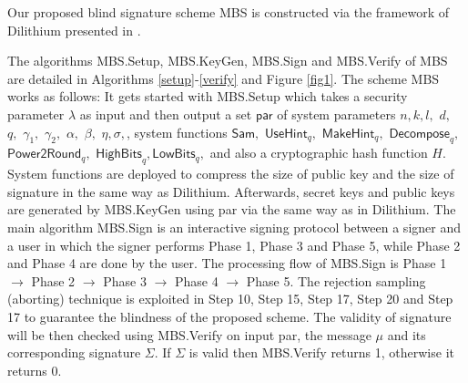 \documentclass[conference]{IEEEtran}
\begin{document}
	Our proposed blind signature scheme \textsf{MBS} is constructed via the framework of \textsf{Dilithium} presented in \cite{DLL+17, DKL+19}. %
	
	The algorithms \textsf{MBS.Setup}, \textsf{MBS.KeyGen}, \textsf{MBS.Sign} and \textsf{MBS.Verify} of \textsf{MBS} are detailed in Algorithms \ref{setup}-\ref{verify} and Figure \ref{fig1}. The scheme \textsf{MBS} works as follows: It gets started with \textsf{MBS.Setup} which takes a security parameter $\lambda$ as input and then output a set $\mathsf{par}$ of system parameters $n, k, l,$  $d,$  $q, $ $\gamma_1,$ $ \gamma_2,$  $\alpha,$ $ \beta,$ $ \eta, \sigma,$, system functions  $\textsf{Sam},$ $ \textsf{UseHint}_q,$ $ \textsf{MakeHint}_q,$ $ \textsf{Decompose}_q, $ $ \textsf{Power2Round}_q,$ $ \textsf{HighBits}_q, \textsf{LowBits}_q,$ and also a cryptographic hash function $H$. System functions are deployed to compress the size of public key and the size of signature in the same way as \textsf{Dilithium}. Afterwards, secret keys and public keys are generated by \textsf{MBS.KeyGen} using \textsf{par} via the same way as in \textsf{Dilithium}. The main algorithm \textsf{MBS.Sign} is an interactive signing protocol between a signer and a user in which the signer performs Phase 1, Phase 3 and Phase 5, while Phase 2 and Phase 4 are done by the user.  The processing flow of \textsf{MBS.Sign} is Phase 1 $\rightarrow$ Phase 2 $\rightarrow$ Phase 3 $\rightarrow$ Phase 4 $\rightarrow$ Phase 5.  The rejection sampling (aborting) technique is exploited in Step 10, Step 15, Step 17, Step 20 and Step 17 to guarantee the blindness of the proposed scheme. The validity of  signature will be then checked using \textsf{MBS.Verify} on input \textsf{par}, the message $\mu$ and its corresponding signature $\Sigma$. If $\Sigma$ is valid then \textsf{MBS.Verify} returns 1, otherwise it returns 0. 	
	
\end{document}
